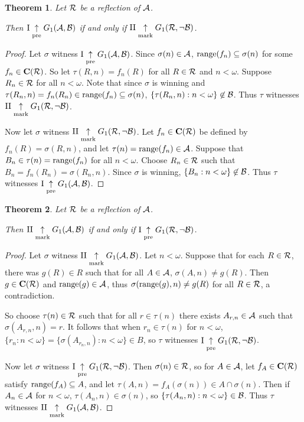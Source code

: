 \documentclass{amsart}
\theoremstyle{plain}
\newtheorem{theorem}{Theorem}
\theoremstyle{definition}
\theoremstyle{remark}
\theoremstyle{plain}
\theoremstyle{definition}
\theoremstyle{remark}
\begin{document}
\begin{theorem}
  Let \(\mathcal{R}\) be a reflection of \(\mathcal{A}\). 

  Then
  \(\mathrm{I}\underset{\text{pre}}{\uparrow}G_{1}(\mathcal{A},\mathcal{B})\) if and only if
  \(\mathrm{II}\underset{\text{mark}}{\uparrow}G_{1}(\mathcal{R},\neg\mathcal{B})\).
\end{theorem}

\begin{proof}
  Let \(\sigma\) witness 
  \(\mathrm{I}\underset{\text{pre}}{\uparrow}G_{1}(\mathcal{A},\mathcal{B})\).
  Since \(\sigma(n)\in\mathcal{A}\),
  \(\text{range}(f_n)\subseteq\sigma(n)\)
  for some \(f_n\in\mathbf C(\mathcal{R})\). So let
  \(\tau(R,n)=f_n(R)\) for all \(R\in \mathcal{R}\) and \(n<\omega\).
  Suppose \(R_n\in \mathcal{R}\) for all \(n<\omega\).
  Note that since \(\sigma\) is winning and 
  \(\tau(R_n,n)=f_n(R_n)\in\text{range}(f_n)\subseteq\sigma(n)\),
  \(\{\tau(R_n,n):n<\omega\}\not\in\mathcal{B}\). Thus \(\tau\) witnesses
  \(\mathrm{II}\underset{\text{mark}}{\uparrow}G_{1}(\mathcal{R},\neg\mathcal{B})\).

  Now let \(\sigma\) witness
  \(\mathrm{II}\underset{\text{mark}}{\uparrow}G_{1}(\mathcal{R},\neg\mathcal{B})\).
  Let \(f_n\in\mathbf C(\mathcal{R})\) be defined by \(f_n(R)=\sigma(R,n)\),
  and let \(\tau(n)=\text{range}(f_n)\in\mathcal{A}\). 
  Suppose that \(B_n\in\tau(n)=\text{range}(f_n)\) for
  all \(n<\omega\). Choose \(R_n\in\mathcal{R}\) such that 
  \(B_n=f_n(R_n)=\sigma(R_n,n)\). Since \(\sigma\) is winning,
  \(\{B_n:n<\omega\}\not\in\mathcal{B}\). Thus \(\tau\) witnesses
  \(\mathrm{I}\underset{\text{pre}}{\uparrow}G_{1}(\mathcal{A},\mathcal{B})\).
\end{proof}

\begin{theorem}
  Let \(\mathcal{R}\) be a reflection of \(\mathcal{A}\). 

  Then
  \(\mathrm{II}\underset{\text{mark}}{\uparrow}G_{1}(\mathcal{A},\mathcal{B})\) if and only if
  \(\mathrm{I}\underset{\text{pre}}{\uparrow}G_{1}(\mathcal{R},\neg\mathcal{B})\).
\end{theorem}

\begin{proof}
  Let \(\sigma\) witness 
  \(\mathrm{II}\underset{\text{mark}}{\uparrow}G_{1}(\mathcal{A},\mathcal{B})\).
  Let \(n<\omega\). Suppose that for each \(R\in\mathcal{R}\),
  there was \(g(R)\in R\) such that for all \(A\in \mathcal{A}\),
  \(\sigma(A,n)\not=g(R)\). Then \(g\in\mathbf C(\mathcal{R})\)
  and \(\text{range}(g)\in\mathcal{A}\),
  thus \(\sigma(\text{range}(g),n)\not=g(R)\) for all \(R\in\mathcal{R}\),
  a contradiction.

  So choose \(\tau(n)\in\mathcal{R}\) such that for all \(r\in \tau(n)\)
  there exists \(A_{r,n}\in\mathcal{A}\) such that \(\sigma(A_{r,n},n)=r\).
  It follows that when \(r_n\in\tau(n)\) for \(n<\omega\),
  \(\{r_n:n<\omega\}=\{\sigma(A_{r_n,n}):n<\omega\}\in B\),
  so \(\tau\) witnesses
  \(\mathrm{I}\underset{\text{pre}}{\uparrow}G_{1}(\mathcal{R},\neg\mathcal{B})\).

  Now let \(\sigma\) witness 
  \(\mathrm{I}\underset{\text{pre}}{\uparrow}G_{1}(\mathcal{R},\neg\mathcal{B})\).
  Then \(\sigma(n)\in\mathcal{R}\), so for \(A\in\mathcal{A}\), let
  \(f_A\in\mathbf C(\mathcal{R})\) satisfy \(\text{range}(f_A)\subseteq A\),
  and let \(\tau(A,n)=f_A(\sigma(n))\in A\cap\sigma(n)\).
  Then if \(A_n\in\mathcal{A}\) for \(n<\omega\), \(\tau(A_n,n)\in\sigma(n)\),
  so \(\{\tau(A_n,n):n<\omega\}\in\mathcal{B}\).
  Thus \(\tau\) witnesses
  \(\mathrm{II}\underset{\text{mark}}{\uparrow}G_{1}(\mathcal{A},\mathcal{B})\).
\end{proof}
\end{document}

